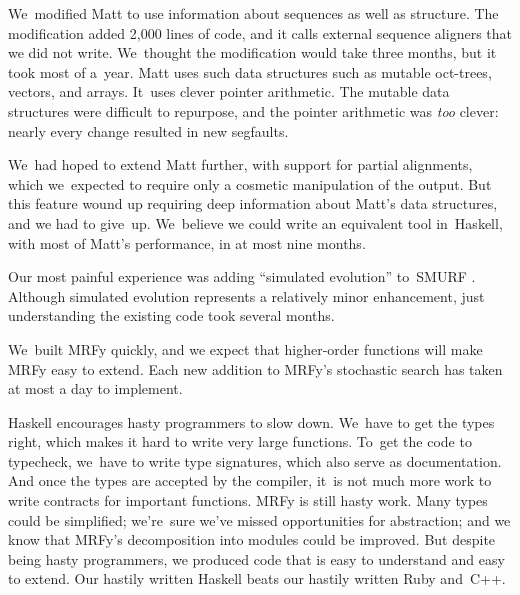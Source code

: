 \documentclass[preprint,nonatbib,blockstyle,nocopyrightspace,times]{sigplanconf}
\let\cite\citep
\begin{document}
We~modified Matt to use information about sequences as well as structure.
The modification added 2,000 lines of code, and it calls
external sequence aligners that we did not write.
We~thought the modification would take three months, 
but it took most of a~year.
Matt uses such
data structures such as mutable oct-trees, vectors, and arrays.
It~uses clever pointer arithmetic.
The mutable data structures were difficult to 
repurpose, and the pointer arithmetic was \emph{too} clever: 
nearly every change resulted in new segfaults.

We~had hoped to extend Matt further, with support for partial alignments,
which we~expected to require only 
a cosmetic manipulation of the 
output.
But
this feature wound up
requiring deep information about Matt's data structures,
and we had to give~up.
We~believe we could write an equivalent tool in~Haskell,
with most of Matt's performance, in at most nine months.

Our most painful experience was adding ``simulated evolution''
to~SMURF \cite{Daniels:2012}. 
Although simulated evolution represents a relatively minor
enhancement,
just understanding the existing code took several months.

We~built MRFy quickly, and we expect that
higher-order functions will make MRFy easy to extend.
Each new addition to MRFy's stochastic search has taken at most a day
to implement.

%
%

Haskell encourages hasty programmers to slow down.
We~have to get the types right,
which makes it hard to write very large functions.
To~get the code to typecheck, we~have to write type signatures, which
also serve as documentation.
And once the types are accepted by the compiler,
it~is not much more work to write contracts for important functions.
MRFy is still hasty work.
Many types could be simplified;
we're~sure we've missed opportunities for abstraction;
and we know that MRFy's decomposition into modules could be improved.
But despite being hasty programmers, we produced code 
that is easy to understand and easy to extend.
Our hastily written Haskell beats
our hastily written Ruby and~C++.
\end{document}
